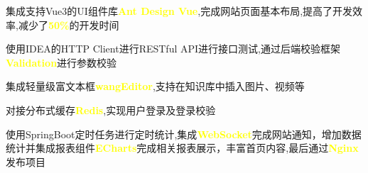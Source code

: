 \begin{cventries}
{\begin{cvitems}
		\item {集成支持Vue3的UI组件库\textcolor{yellow}{\textbf{Ant Design Vue}},完成网站页面基本布局,提高了开发效率,减少了\textcolor{yellow}{\textbf{50\%}}的开发时间}
		\item {使用IDEA的HTTP Client进行RESTful API进行接口测试,通过后端校验框架\textcolor{yellow}{\textbf{Validation}}进行参数校验}
		\item {集成轻量级富文本框\textcolor{yellow}{\textbf{wangEditor}},支持在知识库中插入图片、视频等}
		\item {对接分布式缓存\textcolor{yellow}{\textbf{Redis}},实现用户登录及登录校验}
		\item {使用SpringBoot定时任务进行定时统计,集成\textcolor{yellow}{\textbf{WebSocket}}完成网站通知，增加数据统计并集成报表组件\textcolor{yellow}{\textbf{ECharts}}完成相关报表展示，丰富首页内容,最后通过\textcolor{yellow}{\textbf{Nginx}}发布项目}
	    \end{cvitems}
    }
\end{cventries}
